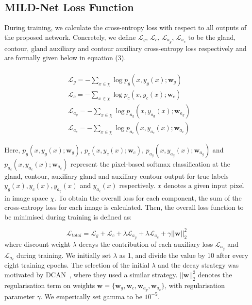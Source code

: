\documentclass[3p]{elsarticle}
\begin{document}
\subsection{MILD-Net Loss Function}

During training, we calculate the cross-entropy loss with respect to all outputs of the proposed network. Concretely, we define $\mathcal{L}_g$, $\mathcal{L}_c$, $\mathcal{L}_{a_g}$, $\mathcal{L}_{a_c}$ to be the gland, contour, gland auxiliary and contour auxiliary cross-entropy loss respectively and are formally given below in equation (3).

\begin{equation}
\begin{split} \\
&\mathcal{L}_g = -\sum_{x \in \chi}{\log p_g(x, y_g(x);  \mathbold{w}_g)}\\ 
&\mathcal{L}_c = -\sum_{x \in \chi}{\log p_c(x, y_c(x);\mathbold{w}_c)}\\
&\mathcal{L}_{a_g} = -\sum_{x \in \chi}{\log p_{a_g}(x, y_{a_g}(x);\mathbold{w}_{a_g})}\\
&\mathcal{L}_{a_c} = -\sum_{x \in \chi}{\log p_{a_c}(x, y_{a_c}(x);\mathbold{w}_{a_c})}
\end{split}
\end{equation}

Here, $p_g(x, y_g(x);\mathbold{w}_g)$, $p_c(x, y_c(x);\mathbold{w}_c)$,  $p_{a_g}(x, y_{a_g}(x);\mathbold{w}_{a_g})$ and  $p_{a_c}(x, y_{a_c}(x);\mathbold{w}_{a_c})$ represent the pixel-based softmax classification at the gland, contour, auxiliary gland and auxiliary contour output for true labels $y_g(x), y_c(x), y_{a_g}(x)$ and  $y_{a_c}(x)$ respectively. $x$ denotes a given input pixel in image space $\chi$. To obtain the overall loss for each component, the sum of the cross-entropy loss for each image is calculated. Then, the overall loss function to be minimised during training is defined as:

\begin{equation}
\mathcal{L}_{total} = \mathcal{L}_g + \mathcal{L}_c + \lambda\mathcal{L}_{a_g} + \lambda\mathcal{L}_{a_c} + \gamma||\mathbold{w}||_2^2
\end{equation}
\noindent where discount weight $\lambda$ decays the contribution of each auxiliary loss $\mathcal{L}_{a_g}$ and $\mathcal{L}_{a_c}$ during training.  We initially set $\lambda$ as 1, and divide the value by 10 after every eight training epochs. The selection of the initial $\lambda$ and the decay strategy was motivated by DCAN~\cite{chen2017dcan}, where they used a similar strategy. $||\mathbold{w}||_2^2$ denotes the regularisation term on weights $\mathbold{w}=\{\mathbold{w}_g,\mathbold{w}_c,\mathbold{w}_{a_g},\mathbold{w}_{a_c}\}$, with regularisation parameter $\gamma$. We emperically set gamma to be $10^{-5}$.
\end{document}
